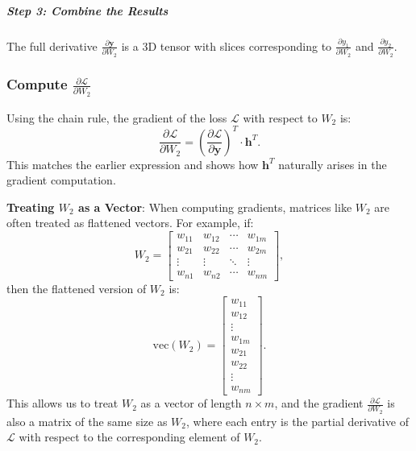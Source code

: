 \begin{notechapter}
\subparagraph*{Step 3: Combine the Results}
The full derivative \( \frac{\partial \mathbf{y}}{\partial W_2} \) is a 3D tensor with slices corresponding to \( \frac{\partial y_1}{\partial W_2} \) and \( \frac{\partial y_2}{\partial W_2} \).

\subsubsection{Compute \( \frac{\partial \mathcal{L}}{\partial W_2} \)}
Using the chain rule, the gradient of the loss \( \mathcal{L} \) with
respect to \( W_2 \) is:
\[
\frac{\partial \mathcal{L}}{\partial W_2} = \left( \frac{\partial \mathcal{L}}{\partial \mathbf{y}} \right)^T \cdot \mathbf{h}^T.
\]
This matches the earlier expression and shows how \( \mathbf{h}^T \) naturally arises in the gradient computation.

\textbf{Treating \( W_2 \) as a Vector}:
When computing gradients, matrices like \( W_2 \) are often treated as flattened vectors. For example, if:
\[
W_2 = \begin{bmatrix}
w_{11} & w_{12} & \cdots & w_{1m} \\
w_{21} & w_{22} & \cdots & w_{2m} \\
\vdots & \vdots & \ddots & \vdots \\
w_{n1} & w_{n2} & \cdots & w_{nm}
\end{bmatrix},
\]
then the flattened version of \( W_2 \) is:
\[
\text{vec}(W_2) = \begin{bmatrix}
w_{11} \\ w_{12} \\ \vdots \\ w_{1m} \\ w_{21} \\ w_{22} \\ \vdots \\ w_{nm}
\end{bmatrix}.
\]
This allows us to treat \( W_2 \) as a vector of length \( n \times m \), and the gradient \( \frac{\partial \mathcal{L}}{\partial W_2} \) is also a matrix of the same size as \( W_2 \), where each entry is the partial derivative of \( \mathcal{L} \) with respect to the corresponding element of \( W_2 \).


\end{notechapter}
